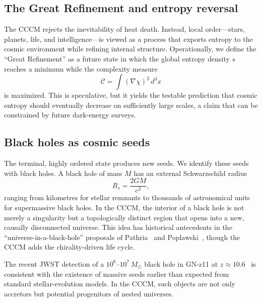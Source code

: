 \documentclass[a4paper,11pt]{article}
\newcommand{\CCCM}{CCCM}
\begin{document}
\subsection{The Great Refinement and entropy reversal}

The \CCCM{} rejects the inevitability of heat death. Instead, local order---stars, planets, life, and intelligence---is viewed as a process that exports entropy to the cosmic environment while refining internal structure. Operationally, we define the ``Great Refinement'' as a future state in which the global entropy density $s$ reaches a minimum while the complexity measure
\begin{equation}
    \mathcal{C} = \int \left(\nabla \chi\right)^2 \, d^3x
    \label{eq:complexity}
\end{equation}
is maximized. This is speculative, but it yields the testable prediction that cosmic entropy should eventually decrease on sufficiently large scales, a claim that can be constrained by future dark-energy surveys.

\subsection{Black holes as cosmic seeds}

The terminal, highly ordered state produces new seeds. We identify these seeds with black holes. A black hole of mass $M$ has an external Schwarzschild radius
\begin{equation}
    R_s = \frac{2GM}{c^2},
    \label{eq:schwarzschild}
\end{equation}
ranging from kilometres for stellar remnants to thousands of astronomical units for supermassive black holes. In the \CCCM, the interior of a black hole is not merely a singularity but a topologically distinct region that opens into a new, causally disconnected universe. This idea has historical antecedents in the ``universe-in-a-black-hole'' proposals of Pathria~\cite{Pathria1972} and Poplawski~\cite{Poplawski2010}, though the \CCCM{} adds the chirality-driven life cycle.

The recent JWST detection of a $10^6$--$10^7\,M_\odot$ black hole in GN-z11 at $z \approx 10.6$~\cite{Johnson2024} is consistent with the existence of massive seeds earlier than expected from standard stellar-evolution models. In the \CCCM, such objects are not only accretors but potential progenitors of nested universes.
\end{document}
